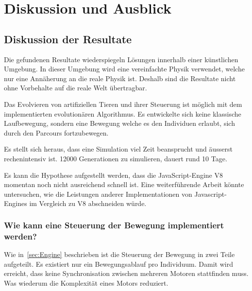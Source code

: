 %
%


\chapter{Diskussion und Ausblick\label{chap:perspective}}

  \section{Diskussion der Resultate\label{sec:diskRes}}

    Die gefundenen Resultate wiederspiegeln Lösungen innerhalb einer künstlichen Umgebung.
    In dieser Umgebung wird eine vereinfachte Physik verwendet, welche nur eine Annäherung an die reale Physik ist.
    Deshalb sind die Resultate nicht ohne Vorbehalte auf die reale Welt übertragbar.

    \medskip

    Das Evolvieren von artifiziellen Tieren und ihrer Steuerung ist möglich
    mit dem implementierten evolutionären Algorithmus.
    Es entwickelte sich keine klassische Laufbewegung,
    sondern eine Bewegung welche es den Individuen erlaubt, sich durch den Parcours fortzubewegen.

    \medskip

    Es stellt sich heraus, dass eine Simulation viel Zeit beansprucht und äusserst rechenintensiv ist.
    12000 Generationen zu simulieren, dauert rund 10 Tage.

    \medskip

    Es kann die Hypothese aufgestellt werden, dass die JavaScript-Engine V8 momentan noch nicht ausreichend schnell ist.
    Eine weiterführende Arbeit könnte untersuchen,
    wie die Leistungen anderer Implementationen von Javascript-Engines im Vergleich zu V8 abschneiden würde.

    \subsection{Wie kann eine Steuerung der Bewegung implementiert werden?}

      Wie in~\vref{sec:Engine} beschrieben ist die Steuerung der Bewegung in zwei Teile aufgeteilt.
      Es existiert nur ein Bewegungsablauf pro Individuum.
      Damit wird erreicht, dass keine Synchronisation zwischen mehreren Motoren stattfinden muss.
      Was wiederum die Komplexität eines Motors reduziert.

